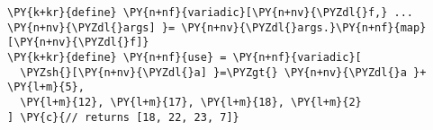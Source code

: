 \begin{Verbatim}[commandchars=\\\{\}]
\PY{k+kr}{define} \PY{n+nf}{variadic}[\PY{n+nv}{\PYZdl{}f,} ... \PY{n+nv}{\PYZdl{}args] }= \PY{n+nv}{\PYZdl{}args.}\PY{n+nf}{map}[\PY{n+nv}{\PYZdl{}f]}
\PY{k+kr}{define} \PY{n+nf}{use} = \PY{n+nf}{variadic}[
  \PYZsh{}[\PY{n+nv}{\PYZdl{}a] }=\PYZgt{} \PY{n+nv}{\PYZdl{}a }+ \PY{l+m}{5}, 
  \PY{l+m}{12}, \PY{l+m}{17}, \PY{l+m}{18}, \PY{l+m}{2}
] \PY{c}{// returns [18, 22, 23, 7]}
\end{Verbatim}
